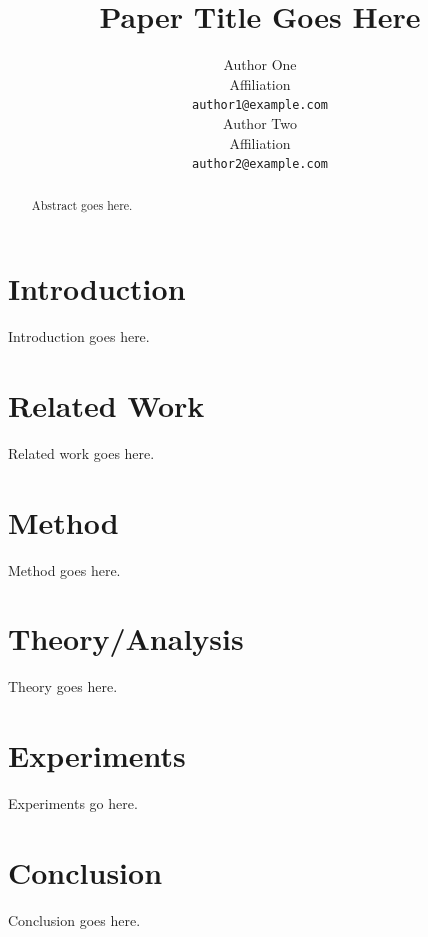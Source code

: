 \documentclass{article}
\title{Paper Title Goes Here}
\author{
  Author One \\
  Affiliation \\
  \texttt{author1@example.com} \\
  \And
  Author Two \\
  Affiliation \\
  \texttt{author2@example.com}
}
\begin{document}
\maketitle

\begin{abstract}
Abstract goes here.
\end{abstract}

\section{Introduction}
Introduction goes here.

\section{Related Work}
Related work goes here.

\section{Method}
Method goes here.

\section{Theory/Analysis}
Theory goes here.

\section{Experiments}
Experiments go here.

\section{Conclusion}
Conclusion goes here.



\end{document}
